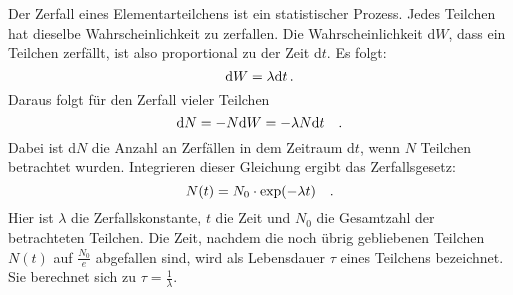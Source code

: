         Der Zerfall eines Elementarteilchens ist ein statistischer Prozess. Jedes Teilchen hat dieselbe Wahrscheinlichkeit zu zerfallen.
        Die Wahrscheinlichkeit d$W$, dass ein Teilchen zerfällt, ist also proportional zu der Zeit d$t$. Es folgt:
        \begin{equation*}
            \text{d}W = \lambda\text{d}t \, .
        \end{equation*}
        Daraus folgt für den Zerfall vieler Teilchen
        \begin{equation*}
            \text{d}N = -N\text{d}W = -\lambda N \text{d}t \quad .
        \end{equation*}
       Dabei ist d$N$ die Anzahl an Zerfällen in dem Zeitraum d$t$, wenn $N$ Teilchen betrachtet wurden.
       Integrieren dieser Gleichung ergibt das Zerfallsgesetz:
       \begin{equation*}
           N(t) = N_0 \cdot \text{exp}(-\lambda t)\quad .
           \label{eqn:exp}
       \end{equation*}
       Hier ist $\lambda$ die Zerfallskonstante, $t$ die Zeit und $N_0$ die Gesamtzahl der betrachteten Teilchen. 
       Die Zeit, nachdem die noch übrig gebliebenen Teilchen $N(t)$ auf $\frac{N_0}{e}$ abgefallen sind, 
       wird als Lebensdauer $\tau$ eines Teilchens bezeichnet. Sie berechnet sich zu $\tau = \frac{1}{\lambda}$.





